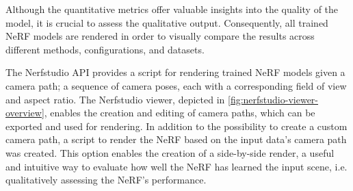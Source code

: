 Although the quantitative metrics offer valuable insights into the quality of the model, it is crucial to assess the qualitative output. Consequently, all trained NeRF models are rendered in order to visually compare the results across different methods, configurations, and datasets.

The Nerfstudio API provides a script for rendering trained NeRF models given a camera path; a sequence of camera poses, each with a corresponding field of view and aspect ratio. The Nerfstudio viewer, depicted in \autoref{fig:nerfstudio-viewer-overview}, enables the creation and editing of camera paths, which can be exported and used for rendering. In addition to the possibility to create a custom camera path, a script to render the NeRF based on the input data's camera path was created. This option enables the creation of a side-by-side render, a useful and intuitive way to evaluate how well the NeRF has learned the input scene, i.e. qualitatively assessing the NeRF's performance.


%


\begin{comment}
\begin{equation} \label{eq:distortion_loss}
\mathcal{L}_{\text{distortion}} = \frac{1}{N} \sum_{i=1}^{N} \left(\sum_{j=1}^{M_i} w_{ij} \sum_{k=1}^{M_i} w_{ik} \left| \frac{t_{ij} + t_{ik}}{2} - \frac{t_{i,j-1} + t_{i,k-1}}{2} \right| \right) + \frac{1}{3N} \sum_{i=1}^{N} \sum_{j=1}^{M_i} w_{ij}^2 (t_{ij} - t_{i,j-1})
\end{equation}

\begin{center}
    \small{where $N$ is the number of ray samples, $M_i$ is the number of samples for the $i$-th ray, $w_{ij}$ is the weight for the $j$-th sample of the $i$-th ray, $t_{ij}$ is the $j$-th sample of the $i$-th ray in the $s$-domain, and $t_{i,j-1}$ is the $(j-1)$-th sample of the $i$-th ray in the $s$-domain.}
\end{center}


\begin{equation} \label{eq:interlevel_loss}
\mathcal{L}_{\text{interlevel}} = \frac{1}{N} \sum_{i=1}^{N-1} \frac{1}{M_i} \sum_{j=1}^{M_i} \left(\max(0, w_j - w_{\text{outer},ij})\right)^2 \cdot \frac{1}{w_j + \epsilon}
\end{equation}

\begin{center}
    \small{where $N$ is the number of ray samples, $M_i$ is the number of samples for the $i$-th ray, $w_j$ is the weight for the $j$-th sample of the $i$-th ray, $w_{\text{outer},ij}$ is the upper bound of the inner histogram for the $j$-th sample of the $i$-th ray, and $\epsilon$ is a small constant.}
\end{center}
\end{comment}




